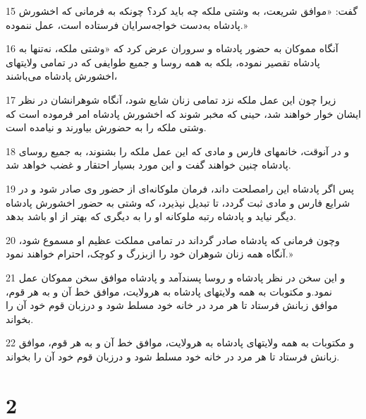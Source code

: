 \par 15 گفت: «موافق شریعت، به وشتی ملکه چه باید کرد؟ چونکه به فرمانی که اخشورش پادشاه به‌دست خواجه‌سرایان فرستاده است، عمل ننموده.»
\par 16 آنگاه مموکان به حضور پادشاه و سروران عرض کرد که «وشتی ملکه، نه‌تنها به پادشاه تقصیر نموده، بلکه به همه روسا و جمیع طوایفی که در تمامی ولایتهای اخشورش پادشاه می‌باشند،
\par 17 زیرا چون این عمل ملکه نزد تمامی زنان شایع شود، آنگاه شوهرانشان در نظر ایشان خوار خواهند شد، حینی که مخبر شوند که اخشورش پادشاه امر فرموده است که وشتی ملکه را به حضورش بیاورند و نیامده است.
\par 18 و در آنوقت، خانمهای فارس و مادی که این عمل ملکه را بشنوند، به جمیع روسای پادشاه چنین خواهند گفت و این مورد بسیار احتقار و غضب خواهد شد.
\par 19 پس اگر پادشاه این رامصلحت داند، فرمان ملوکانه‌ای از حضور وی صادر شود و در شرایع فارس و مادی ثبت گردد، تا تبدیل نپذیرد، که وشتی به حضور اخشورش پادشاه دیگر نیاید و پادشاه رتبه ملوکانه او را به دیگری که بهتر از او باشد بدهد.
\par 20 وچون فرمانی که پادشاه صادر گرداند در تمامی مملکت عظیم او مسموع شود، آنگاه همه زنان شوهران خود را ازبزرگ و کوچک، احترام خواهند نمود.»
\par 21 و این سخن در نظر پادشاه و روسا پسندآمد و پادشاه موافق سخن مموکان عمل نمود.و مکتوبات به همه ولایتهای پادشاه به هرولایت، موافق خط آن و به هر قوم، موافق زبانش فرستاد تا هر مرد در خانه خود مسلط شود و درزبان قوم خود آن را بخواند.
\par 22 و مکتوبات به همه ولایتهای پادشاه به هرولایت، موافق خط آن و به هر قوم، موافق زبانش فرستاد تا هر مرد در خانه خود مسلط شود و درزبان قوم خود آن را بخواند.
 
\chapter{2}

